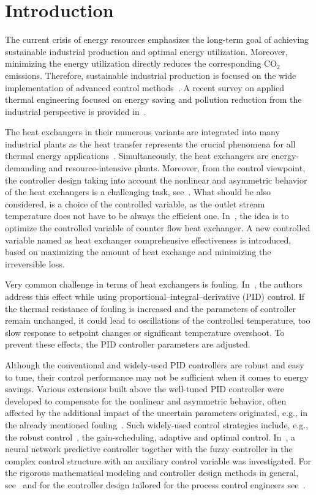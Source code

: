 \documentclass[preprint,12pt]{elsarticle}
\begin{document}
	
	\section{Introduction}
	\label{sec:introduction}
	

	The current crisis of energy resources emphasizes the long-term goal of achieving sustainable industrial production and optimal energy utilization. Moreover, minimizing the energy utilization directly reduces the corresponding CO$_{2}$ emissions. Therefore, sustainable industrial production is focused on the wide implementation of advanced control methods~\cite{MN20}. A recent survey on applied thermal engineering focused on energy saving and pollution reduction from the industrial perspective is provided in~\cite{YV16}.
	
	The heat exchangers in their numerous variants are integrated into many industrial plants as the heat transfer represents the crucial phenomena for all thermal energy applications~\cite{KV18}. Simultaneously, the heat exchangers are energy-demanding and resource-intensive plants. Moreover, from the control viewpoint, the controller design taking into account the nonlinear and asymmetric behavior of the heat exchangers is a challenging task, see~\cite{RL20}. What should be also considered, is a choice of the controlled variable, as the outlet stream temperature does not have to be always the efficient one. In~\cite{JIN_CV}, the idea is to optimize the controlled variable of counter flow heat exchanger. A new controlled variable named as heat exchanger comprehensive effectiveness is introduced, based on maximizing the amount of heat exchange and minimizing the irreversible loss. 
	
	Very common challenge in terms of heat exchangers is fouling. In~\cite{TRAFCZYNSKI_fouling}, the authors address this effect while using proportional–integral–derivative (PID) control. If the thermal resistance of fouling is increased and the parameters of controller remain unchanged, it could lead to oscillations of the controlled temperature, too slow response to setpoint changes or significant temperature overshoot. To prevent these effects, the PID controller parameters are adjusted. 
	
	Although the conventional and widely-used PID controllers are robust and easy to tune, their control performance may not be sufficient when it comes to energy savings. Various extensions built above the well-tuned PID controller were developed to compensate for the nonlinear and asymmetric behavior, often affected by the additional impact of the uncertain parameters originated, e.g., in the already mentioned fouling~\cite{MT19}. Such widely-used control strategies include, e.g., the robust control~\cite{WY18}, the gain-scheduling, adaptive and optimal control. In~\cite{VASICKANINOVA_HE}, a neural network predictive controller together with the fuzzy controller in the complex control structure with an auxiliary control variable was investigated. For the rigorous mathematical modeling and controller design methods in general, see~\cite{MF08} and for the controller design tailored for the process control engineers see~\cite{Liptak}.
	
\end{document}
